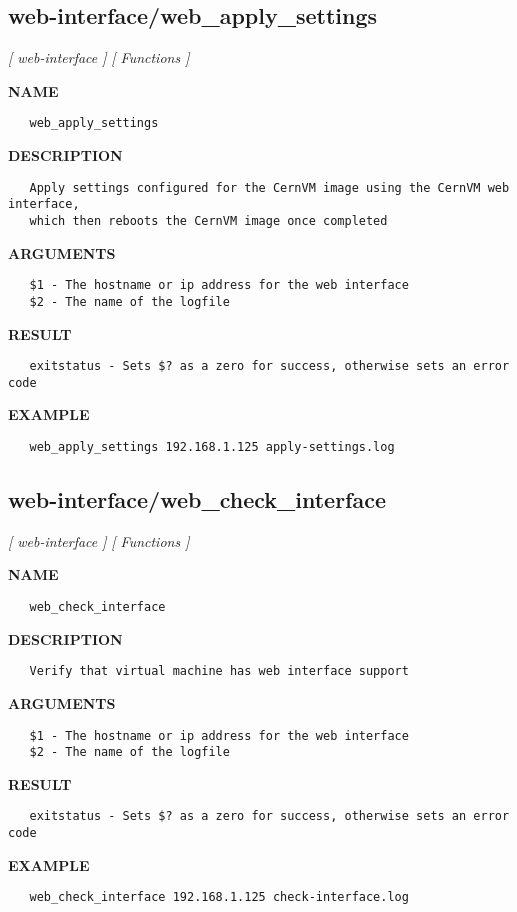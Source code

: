 \subsection{web-interface/web\_apply\_settings}
\textsl{[ web-interface ]}
\textsl{[ Functions ]}

\label{ch:robo69}
\label{ch:web_interface_web_apply_settings}
\textbf{NAME}
\begin{verbatim}
   web_apply_settings
\end{verbatim}
\textbf{DESCRIPTION}
\begin{verbatim}
   Apply settings configured for the CernVM image using the CernVM web interface, 
   which then reboots the CernVM image once completed
\end{verbatim}
\textbf{ARGUMENTS}
\begin{verbatim}
   $1 - The hostname or ip address for the web interface
   $2 - The name of the logfile
\end{verbatim}
\textbf{RESULT}
\begin{verbatim}
   exitstatus - Sets $? as a zero for success, otherwise sets an error code
\end{verbatim}
\textbf{EXAMPLE}
\begin{verbatim}
   web_apply_settings 192.168.1.125 apply-settings.log
\end{verbatim}
\newpage
\subsection{web-interface/web\_check\_interface}
\textsl{[ web-interface ]}
\textsl{[ Functions ]}

\label{ch:robo70}
\label{ch:web_interface_web_check_interface}
\textbf{NAME}
\begin{verbatim}
   web_check_interface
\end{verbatim}
\textbf{DESCRIPTION}
\begin{verbatim}
   Verify that virtual machine has web interface support
\end{verbatim}
\textbf{ARGUMENTS}
\begin{verbatim}
   $1 - The hostname or ip address for the web interface
   $2 - The name of the logfile
\end{verbatim}
\textbf{RESULT}
\begin{verbatim}
   exitstatus - Sets $? as a zero for success, otherwise sets an error code
\end{verbatim}
\textbf{EXAMPLE}
\begin{verbatim}
   web_check_interface 192.168.1.125 check-interface.log
\end{verbatim}
\newpage
